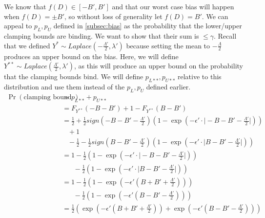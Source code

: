 \documentclass[11pt]{scrartcl} %
\begin{document}
We know that $f(D) \in [-B', B']$ and that our worst case bias will happen when $f(D) = \pm B'$, so without loss of generality
let $f(D) = B'$. We can appeal to $p_L, p_U$ defined in \autoref{subsec:bias} as the probability that the lower/upper
clamping bounds are binding. We want to show that their sum is $\leq \gamma$.
Recall that we defined $Y^* \sim Laplace(-\frac{\Lambda'}{2}, \lambda')$ because setting the mean to
$-\frac{\Lambda}{2}$ produces an upper bound on the bias.
Here, we will define $Y^{**} \sim Laplace(\frac{\Lambda'}{2}, \lambda')$, as this will produce an
upper bound on the probability that the clamping bounds bind. We will define $p_{L**}, p_{U**}$
relative to this distribution and use them instead of the $p_L, p_U$ defined earlier.
\begin{align}
	\Pr(\text{clamping bound binds}) &= p_{L**} + p_{U**} \nonumber \\
							  &= F_{Y^{**}}(-B - B') + 1 - F_{Y^{**}}(B - B') \nonumber \\
							  &= \frac{1}{2} + \frac{1}{2}sign\left(-B - B' - \frac{\Lambda'}{2}\right) \left( 1-\exp\left( -\epsilon' \cdot \big\vert -B - B' - \frac{\Lambda'}{2} \big\vert \right) \right) \nonumber \\
							  &\hspace{10pt} + 1 \nonumber \\
							  &\hspace{10pt} - \frac{1}{2} - \frac{1}{2}sign\left(B - B' - \frac{\Lambda'}{2}\right) \left( 1-\exp\left( -\epsilon' \cdot \big\vert B - B' - \frac{\Lambda'}{2} \big\vert \right) \right) \nonumber \\
							  &= 1 - \frac{1}{2} \left( 1-\exp\left( -\epsilon' \cdot \big\vert -B - B' - \frac{\Lambda'}{2} \big\vert \right) \right) \nonumber \\
							  &\hspace{20pt} - \frac{1}{2} \left( 1-\exp\left( -\epsilon' \cdot \big\vert B - B' - \frac{\Lambda'}{2} \big\vert \right) \right) \label{eq:choosing_B_p1} \\
							  &= 1 - \frac{1}{2} \left(1-\exp \left( -\epsilon' \left( B + B' + \frac{\Lambda'}{2} \right) \right) \right) \nonumber \\
							  &\hspace{20pt} - \frac{1}{2} \left( 1-\exp\left( -\epsilon' \left( B - B' - \frac{\Lambda'}{2} \right) \right) \right) \nonumber \\
							  &= \frac{1}{2} \left( \exp \left( -\epsilon' \left( B + B' + \frac{\Lambda'}{2} \right) \right) + \exp\left( -\epsilon' \left( B - B' - \frac{\Lambda'}{2} \right) \right) \right) \nonumber \\

\end{align}
\end{document}
